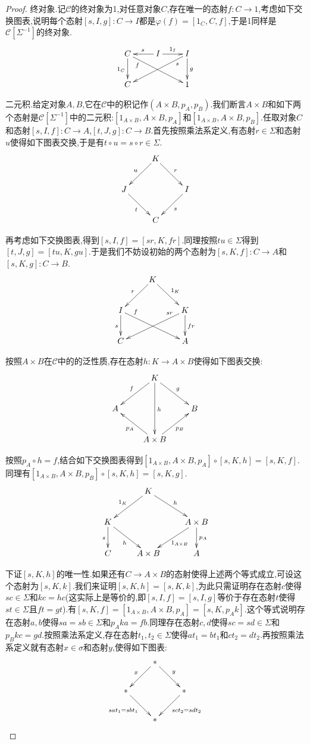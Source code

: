 \begin{enumerate}
\begin{proof}
    	终对象.记$\mathscr{C}$的终对象为1,对任意对象$C$,存在唯一的态射$f:C\to1$,考虑如下交换图表,说明每个态射$[s,I,g]:C\to I$都是$\varphi(f)=[1_C,C,f]$,于是1同样是$\mathscr{C}[\Sigma^{-1}]$的终对象.
    	$$\xymatrix{C\ar[d]_{1_C}\ar[drr]_(0.2)f&I\ar[l]_s\ar[r]^{1_I}&I\ar[d]^g\ar[dll]^(0.2)s\\C&&1}$$
    	
    	二元积.给定对象$A,B$,它在$\mathscr{C}$中的积记作$(A\times B,p_A,p_B)$.我们断言$A\times B$和如下两个态射是$\mathscr{C}[\Sigma^{-1}]$中的二元积:$[1_{A\times B},A\times B,p_A]$和$[1_{A\times B},A\times B,p_B]$.任取对象$C$和态射$[s,I,f]:C\to A$,$[t,J,g]:C\to B$.首先按照乘法系定义,有态射$r\in\Sigma$和态射$u$使得如下图表交换,于是有$t\circ u=s\circ r\in\Sigma$.
    	$$\xymatrix{&K\ar[dl]_u\ar[dr]^r&\\J\ar[dr]_t&&I\ar[dl]^s\\&C&}$$
    	
    	再考虑如下交换图表,得到$[s,I,f]=[sr,K,fr]$.同理按照$tu\in\Sigma$得到$[t,J,g]=[tu,K,gu]$.于是我们不妨设初始的两个态射为$[s,K,f]:C\to A$和$[s,K,g]:C\to B$.
    	$$\xymatrix{&K\ar[dl]_r\ar[dr]^{1_K}&\\I\ar[d]_s\ar[drr]^(0.2)f&&K\ar[d]^{fr}\ar[dll]_(0.2){sr}\\C&&A}$$
    	
    	按照$A\times B$在$\mathscr{C}$中的的泛性质,存在态射$h:K\to A\times B$使得如下图表交换:
    	$$\xymatrix{&K\ar[dl]_{f}\ar[dr]^{g}\ar[dd]^h&\\A&&B\\&A\times B\ar[ur]_{p_B}\ar[ul]^{p_A}&}$$
    	
    	按照$p_A\circ h=f$,结合如下交换图表得到$[1_{A\times B},A\times B,p_A]\circ[s,K,h]=[s,K,f]$.同理有$[1_{A\times B},A\times B,p_B]\circ[s,K,h]=[s,K,g]$.
    	$$\xymatrix{&K\ar[dr]^h\ar[dl]_{1_K}&\\K\ar[d]_{s}\ar[dr]_h&&A\times B\ar[d]^{p_A}\ar[dl]^{1_{A\times B}}\\C&A\times B&A}$$
    	
    	下证$[s,K,h]$的唯一性.如果还有$C\to A\times B$的态射使得上述两个等式成立,可设这个态射为$[s,K,k]$.我们来证明$[s,K,h]=[s,K,k]$,为此只需证明存在态射$c$使得$sc\in\Sigma$和$kc=hc$(这实际上是等价的,即$[s,I,f]=[s,I,g]$等价于存在态射$t$使得$st\in\Sigma$且$ft=gt$).有$[s,K,f]=[1_{A\times B},A\times B,p_A]=[s,K,p_Ak]$.这个等式说明存在态射$a,b$使得$sa=sb\in\Sigma$和$p_Aka=fb$.同理存在态射$c,d$使得$sc=sd\in\Sigma$和$p_Bkc=gd$.按照乘法系定义,存在态射$t_1,t_2\in\Sigma$使得$at_1=bt_1$和$ct_2=dt_2$.再按照乘法系定义就有态射$x\in\sigma$和态射$y$,使得如下图表:
    	$$\xymatrix{&\ast\ar[dl]_x\ar[dr]^y&\\\ast\ar[dr]_{sat_1=sbt_1}&&\ast\ar[dl]^{sct_2=sdt_2}\\&\ast&}$$
    	

\end{proof}
\end{enumerate}
